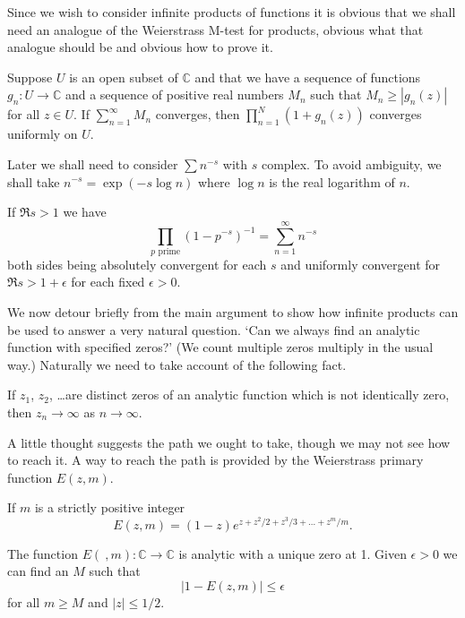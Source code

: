 Since we wish to consider infinite products of functions
it is obvious that we shall need an analogue
of the Weierstrass M-test for products, obvious what that
analogue should be and obvious how to prove it.
\begin{lemma} Suppose $U$ is an open subset of ${\mathbb C}$
and that we have a sequence of functions
$g_{n}:U\rightarrow{\mathbb C}$ and a sequence of positive
real numbers $M_{n}$ such that $M_{n}\geq |g_{n}(z)|$
for all $z\in U$. If $\sum_{n=1}^{\infty}M_{n}$
converges, then $\prod_{n=1}^{N}(1+g_{n}(z))$ converges
uniformly on $U$.
\end{lemma}
Later we shall need to consider $\sum n^{-s}$ with $s$ complex.
To avoid ambiguity, we shall take $n^{-s}=\exp(-s\log n)$
where $\log n$ is the real logarithm of $n$.
\begin{lemma} If $\Re s>1$ we have
\[\prod_{\text{$p$ prime}}(1-p^{-s})^{-1}=\sum_{n=1}^{\infty}n^{-s}\]
both sides being absolutely convergent for each $s$
and uniformly convergent for $\Re s>1+\epsilon$ for
each fixed $\epsilon>0$.
\end{lemma}

We now detour briefly from the main argument to show
how infinite products can be used to answer a
very natural question. `Can we always find an analytic
function
with specified zeros?' (We count multiple zeros
multiply in the usual way.) Naturally we need to
take account of the following fact.
\begin{lemma} If $z_{1}$, $z_{2}$, \dots are distinct zeros
of an analytic function which is not identically
zero, then $z_{n}\rightarrow\infty$ as $n\rightarrow\infty$.
\end{lemma}

A little thought suggests the path we ought to take,
though we may not see how to reach it. A way to
reach the path is provided by the Weierstrass
primary function $E(z,m)$.
\begin{definition} If $m$ is a strictly positive integer
\[E(z,m)=(1-z)e^{z+z^{2}/2+z^{3}/3+\dots+z^{m}/m}.\]
\end{definition}
\begin{lemma} The function $E(\ ,m):\mathbb{C}\rightarrow\mathbb{C}$
is analytic with a unique zero at 1. Given $\epsilon>0$
we can find an $M$ such that
\[|1-E(z,m)|\leq \epsilon\]
for all $m\geq M$ and $|z|\leq 1/2$.
\end{lemma}


